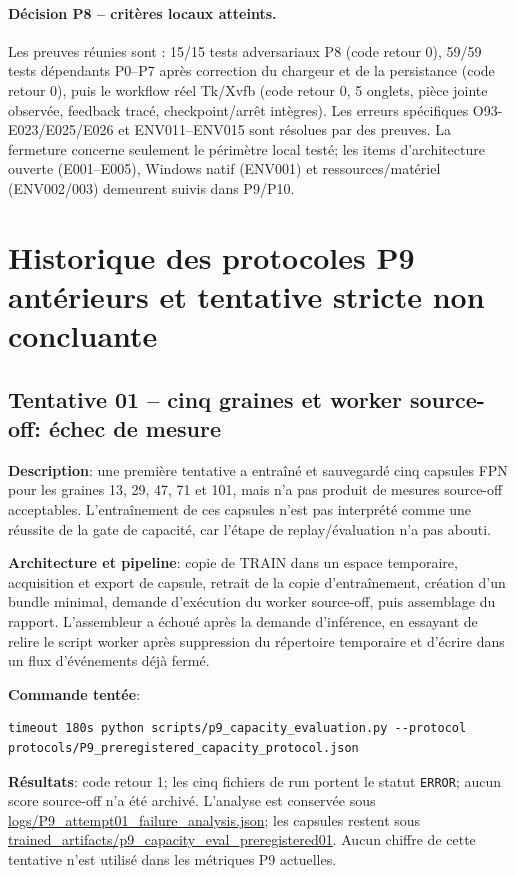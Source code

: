\documentclass[11pt,a4paper,oneside]{report}
\begin{document}
\paragraph{Décision P8 -- critères locaux atteints.}
Les preuves réunies sont : 15/15 tests adversariaux P8 (code retour 0), 59/59 tests dépendants P0--P7 après correction du chargeur et de la persistance (code retour 0), puis le workflow réel Tk/Xvfb (code retour 0, 5 onglets, pièce jointe observée, feedback tracé, checkpoint/arrêt intègres). Les erreurs spécifiques O93-E023/E025/E026 et ENV011--ENV015 sont résolues par des preuves. La fermeture concerne seulement le périmètre local testé; les items d'architecture ouverte (E001--E005), Windows natif (ENV001) et ressources/matériel (ENV002/003) demeurent suivis dans P9/P10.

\section{Historique des protocoles P9 antérieurs et tentative stricte non concluante}
\subsection{Tentative 01 -- cinq graines et worker source-off: échec de mesure}
\textbf{Description}: une première tentative a entraîné et sauvegardé cinq capsules FPN pour les graines 13, 29, 47, 71 et 101, mais n'a pas produit de mesures source-off acceptables. L'entraînement de ces capsules n'est pas interprété comme une réussite de la gate de capacité, car l'étape de replay/évaluation n'a pas abouti.

\textbf{Architecture et pipeline}: copie de TRAIN dans un espace temporaire, acquisition et export de capsule, retrait de la copie d'entraînement, création d'un bundle minimal, demande d'exécution du worker source-off, puis assemblage du rapport. L'assembleur a échoué après la demande d'inférence, en essayant de relire le script worker après suppression du répertoire temporaire et d'écrire dans un flux d'événements déjà fermé.

\textbf{Commande tentée}:
\begin{lstlisting}[basicstyle=\ttfamily\small,breaklines=true]
timeout 180s python scripts/p9_capacity_evaluation.py --protocol protocols/P9_preregistered_capacity_protocol.json
\end{lstlisting}
\textbf{Résultats}: code retour 1; les cinq fichiers de run portent le statut \texttt{ERROR}; aucun score source-off n'a été archivé. L'analyse est conservée sous \url{logs/P9_attempt01_failure_analysis.json}; les capsules restent sous \url{trained_artifacts/p9_capacity_eval_preregistered01}. Aucun chiffre de cette tentative n'est utilisé dans les métriques P9 actuelles.
\end{document}

